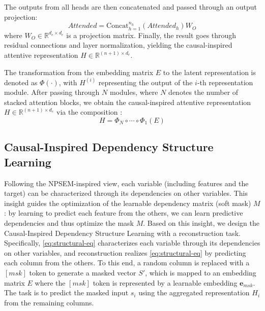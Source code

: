 \documentclass[conference]{IEEEtran}
\newcommand{\sy}[1]{{\color{black}#1}}
\newcommand{\rln}[1]{{\color{black}#1}}
\newcommand{\sytwo}[1]{{\color{black}#1}}
\newcommand{\rlend}[1]{{\color{black}#1}}
\newcommand{\syend}[1]{{\color{black}#1}}
\newcommand{\syadd}[1]{{\color{black}#1}}
\newcommand{\syic}[1]{{\color{black}#1}}
\newcommand{\syone}[1]{{\color{black}#1}}
\begin{document}
\rlend{
The outputs from all heads are then concatenated and passed through an output projection: \syadd{
\begin{equation}
    \textit{Attended} = \text{Concat}_{h=1}^{n_h}(\textit{Attended}_h) W_O
    \label{eq:concat-proj}
\end{equation}}
where $W_O \in \mathbb{R}^{d_e \times d_e}$ is a projection matrix. Finally, the result goes through residual connections and layer normalization, yielding the \syone{causal-inspired attentive} representation $H \in \mathbb{R}^{(n+1) \times d_e}$.
}

\sy{The transformation from the embedding matrix $E$ to the latent representation is denoted as $\Phi(\cdot)$\syend{, with $H^{(i)}$ representing the output of }the $i$-th representation module. After passing through $N$ modules, \syadd{where $N$ denotes the number of stacked attention blocks,} we obtain the \syone{causal-inspired attentive} representation $H \in \mathbb{R}^{(n+1) \times d_e}$ \syend{via the composition}} \syadd{:
\begin{equation}
    H = \Phi_N \circ \cdots \circ \Phi_1(E)
    \label{eq:final-composition}
\end{equation}}

\subsection{\syic{Causal-Inspired Dependency Structure Learning}}\label{sec:causal_extraction}
\syic{Following the NPSEM-inspired view, each \syadd{variable} (including features and \syone{the target}) can be characterized through its dependencies on other variables.}
\rln{This insight guides the optimization of the learnable \syic{dependency matrix (soft mask)} $M$: by learning to predict each \syadd{feature} from \syic{the others, we can learn predictive dependencies} and thus optimize the \syic{mask $M$}. Based on this insight, we design the \syic{Causal-Inspired Dependency Structure Learning} with a reconstruction task. }
\syadd{
Specifically, \eqref{eq:structural-eq} \syic{characterizes each variable through its dependencies on other variables, and 
reconstruction realizes \eqref{eq:structural-eq} by predicting each column from the others. }
} 
To this end, a random column is \sytwo{replaced with a $[msk]$ token to generate a masked vector $S'$, which is mapped to an embedding matrix $E$ where the $[msk]$ token is represented by a learnable embedding $\mathbf{e}_{msk}$. The} task is to predict the masked input $s_i$ using the aggregated representation $H_i$ from the remaining columns.
\end{document}
